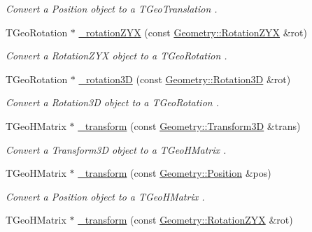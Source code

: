 \begin{DoxyCompactItemize}
\begin{DoxyCompactList}\small\item\em Convert a Position object to a T\+Geo\+Translation . \end{DoxyCompactList}\item 
T\+Geo\+Rotation $\ast$ \hyperlink{group___d_d4_h_e_p___g_e_o_m_e_t_r_y_gac468c0a81631e0a1c052094131f9d680}{\+\_\+rotation\+Z\+YX} (const \hyperlink{namespace_d_d4hep_1_1_geometry_a24667b2b9c3cec3d5239828db4d52189}{Geometry\+::\+Rotation\+Z\+YX} \&rot)
\begin{DoxyCompactList}\small\item\em Convert a Rotation\+Z\+YX object to a T\+Geo\+Rotation . \end{DoxyCompactList}\item 
T\+Geo\+Rotation $\ast$ \hyperlink{group___d_d4_h_e_p___g_e_o_m_e_t_r_y_ga1dc4cc8b92d11d2fc874ed142c7b1bbc}{\+\_\+rotation3D} (const \hyperlink{namespace_d_d4hep_1_1_geometry_a022fecb763315fa2bf39cbb648944a0e}{Geometry\+::\+Rotation3D} \&rot)
\begin{DoxyCompactList}\small\item\em Convert a Rotation3D object to a T\+Geo\+Rotation . \end{DoxyCompactList}\item 
T\+Geo\+H\+Matrix $\ast$ \hyperlink{group___d_d4_h_e_p___g_e_o_m_e_t_r_y_ga01d65a905944a17404358ea0116d4dd3}{\+\_\+transform} (const \hyperlink{namespace_d_d4hep_1_1_geometry_aeb4c0356d12fd7be49a0aae50514e64b}{Geometry\+::\+Transform3D} \&trans)
\begin{DoxyCompactList}\small\item\em Convert a Transform3D object to a T\+Geo\+H\+Matrix . \end{DoxyCompactList}\item 
T\+Geo\+H\+Matrix $\ast$ \hyperlink{group___d_d4_h_e_p___g_e_o_m_e_t_r_y_ga543149f9fccc6961eb19ab307f96e192}{\+\_\+transform} (const \hyperlink{namespace_d_d4hep_1_1_geometry_a55083902099d03506c6db01b80404900}{Geometry\+::\+Position} \&pos)
\begin{DoxyCompactList}\small\item\em Convert a Position object to a T\+Geo\+H\+Matrix . \end{DoxyCompactList}\item 
T\+Geo\+H\+Matrix $\ast$ \hyperlink{group___d_d4_h_e_p___g_e_o_m_e_t_r_y_gaf3a07560a5302fbb20eed5a933e611d8}{\+\_\+transform} (const \hyperlink{namespace_d_d4hep_1_1_geometry_a24667b2b9c3cec3d5239828db4d52189}{Geometry\+::\+Rotation\+Z\+YX} \&rot)

\end{DoxyCompactItemize}
